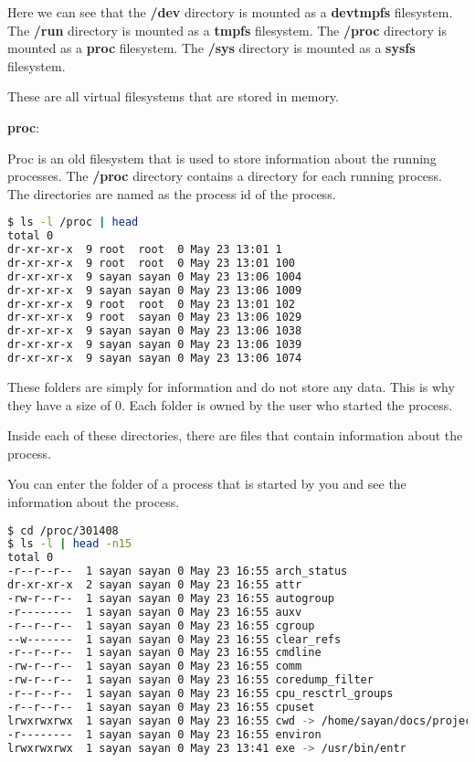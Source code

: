 Here we can see that the \textbf{/dev} directory is mounted as a \textbf{devtmpfs} filesystem.
The \textbf{/run} directory is mounted as a \textbf{tmpfs} filesystem.
The \textbf{/proc} directory is mounted as a \textbf{proc} filesystem.
The \textbf{/sys} directory is mounted as a \textbf{sysfs} filesystem.

These are all virtual filesystems that are stored in memory.

\textbf{proc}:

Proc is an old filesystem that is used to store information about the running processes.
The \textbf{/proc} directory contains a directory for each running process.
The directories are named as the process id of the process.

\begin{lstlisting}[language=bash]
$ ls -l /proc | head
total 0
dr-xr-xr-x  9 root  root  0 May 23 13:01 1
dr-xr-xr-x  9 root  root  0 May 23 13:01 100
dr-xr-xr-x  9 sayan sayan 0 May 23 13:06 1004
dr-xr-xr-x  9 sayan sayan 0 May 23 13:06 1009
dr-xr-xr-x  9 root  root  0 May 23 13:01 102
dr-xr-xr-x  9 root  sayan 0 May 23 13:06 1029
dr-xr-xr-x  9 sayan sayan 0 May 23 13:06 1038
dr-xr-xr-x  9 sayan sayan 0 May 23 13:06 1039
dr-xr-xr-x  9 sayan sayan 0 May 23 13:06 1074
\end{lstlisting}

These folders are simply for information and do not store any data.
This is why they have a size of 0.
Each folder is owned by the user who started the process.

Inside each of these directories, there are files that contain information about the process.

You can enter the folder of a process that is started by you and see the information about the process.

\begin{lstlisting}[language=bash]
$ cd /proc/301408
$ ls -l | head -n15
total 0
-r--r--r--  1 sayan sayan 0 May 23 16:55 arch_status
dr-xr-xr-x  2 sayan sayan 0 May 23 16:55 attr
-rw-r--r--  1 sayan sayan 0 May 23 16:55 autogroup
-r--------  1 sayan sayan 0 May 23 16:55 auxv
-r--r--r--  1 sayan sayan 0 May 23 16:55 cgroup
--w-------  1 sayan sayan 0 May 23 16:55 clear_refs
-r--r--r--  1 sayan sayan 0 May 23 16:55 cmdline
-rw-r--r--  1 sayan sayan 0 May 23 16:55 comm
-rw-r--r--  1 sayan sayan 0 May 23 16:55 coredump_filter
-r--r--r--  1 sayan sayan 0 May 23 16:55 cpu_resctrl_groups
-r--r--r--  1 sayan sayan 0 May 23 16:55 cpuset
lrwxrwxrwx  1 sayan sayan 0 May 23 16:55 cwd -> /home/sayan/docs/projects/sc-handbook
-r--------  1 sayan sayan 0 May 23 16:55 environ
lrwxrwxrwx  1 sayan sayan 0 May 23 13:41 exe -> /usr/bin/entr
\end{lstlisting}

